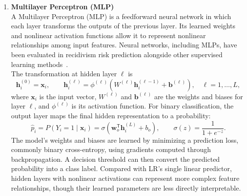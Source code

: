 \documentclass[12pt]{article}
\begin{document}
\begin{enumerate}
  With labels encoded as $y_i\in\{-1,+1\}$, the linear SVM decision function and predicted class are
  \[
  f(\mathbf{x}_i)=\mathbf{w}^{\mathsf T}\mathbf{x}_i+b,
  \qquad
  \hat{y}_i=\operatorname{sign}\!\left(f(\mathbf{x}_i)\right),
  \]
  where $\mathbf{w}$ determines the boundary's orientation and $b$ its offset. A common soft-margin formulation is
  \[
  \min_{\mathbf{w},b,\boldsymbol{\xi}}\quad
  \frac{1}{2}\|\mathbf{w}\|_2^2+C\sum_{i=1}^{n}\xi_i
  \quad\text{subject to}\quad
  y_i(\mathbf{w}^{\mathsf T}\mathbf{x}_i+b)\geq 1-\xi_i,\quad \xi_i\geq0.
  \]
  The slack variables $\xi_i$ allow points to fall within the margin or be misclassified; $C$ controls the trade-off between a wide margin and violations. An SVM's decision function is a signed score rather than a probability, so probability estimates require a separate calibration procedure.\\

 \item \textbf{Multilayer Perceptron (MLP)}\\
  \tabto{2em} A Multilayer Perceptron (MLP) is a feedforward neural network in which each layer transforms the outputs of the previous layer. Its learned weights and nonlinear activation functions allow it to represent nonlinear relationships among input features. Neural networks, including MLPs, have been evaluated in recidivism risk prediction alongside other supervised learning methods~\cite{duwe2017out,travaini2022machine}.\\

  The transformation at hidden layer $\ell$ is
  \[
  \mathbf{h}_i^{(0)}=\mathbf{x}_i,
  \qquad
  \mathbf{h}_i^{(\ell)}=\phi^{(\ell)}\!\left(W^{(\ell)}\mathbf{h}_i^{(\ell-1)}+\mathbf{b}^{(\ell)}\right),
  \quad \ell=1,\ldots,L,
  \]
  where $\mathbf{x}_i$ is the input vector, $W^{(\ell)}$ and $\mathbf{b}^{(\ell)}$ are the weights and biases for layer $\ell$, and $\phi^{(\ell)}$ is its activation function. For binary classification, the output layer maps the final hidden representation to a probability:
  \[
  \hat{p}_i=P(Y_i=1\mid\mathbf{x}_i)
  =\sigma\!\left(\mathbf{w}_{o}^{\mathsf T}\mathbf{h}_i^{(L)}+b_o\right),
  \qquad \sigma(z)=\frac{1}{1+e^{-z}}.
  \]
  The model's weights and biases are learned by minimizing a prediction loss, commonly binary cross-entropy, using gradients computed through backpropagation. A decision threshold can then convert the predicted probability into a class label. Compared with LR's single linear predictor, hidden layers with nonlinear activations can represent more complex feature relationships, though their learned parameters are less directly interpretable.\\
\end{enumerate}
\end{document}
